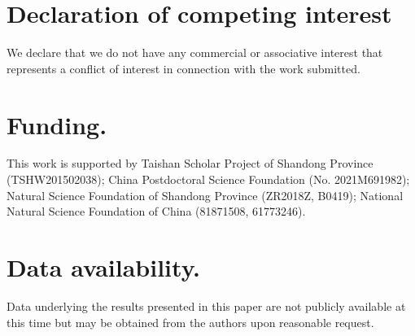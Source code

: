 \documentclass[a4paper,fleqn]{cas-dc}
\begin{document}
\section*{Declaration of competing interest}
We declare that we do not have any commercial or associative interest that represents a conflict of interest in connection with the work submitted.


\section*{Funding.}
This work is supported by Taishan Scholar Project of Shandong Province (TSHW201502038); China Postdoctoral Science Foundation (No. 2021M691982); Natural Science Foundation of Shandong Province (ZR2018Z, B0419); National Natural Science Foundation of China (81871508, 61773246).


\section*{Data availability.} Data underlying the results presented in this paper are not publicly available at this time but may be obtained from the authors upon reasonable request.

\added{\printcredits}

%





\end{document}
